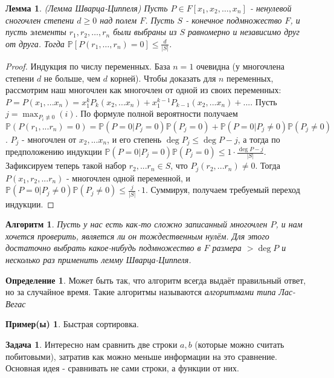 \documentclass[a4paper]{article}
\theoremstyle{indented}
\newtheorem{lemma}{Лемма}
\newtheorem{alg}{Алгоритм}
\theoremstyle{definition}
\newtheorem{defn}{Определение}
\newtheorem{exl}{Пример(ы)}
\newtheorem{prob}{Задача}
\theoremstyle{remark}
\begin{document}
\begin{lemma}
(Лемма Шварца-Циппеля) Пусть $P \in F[x_1, x_2, \ldots, x_n]$ - ненулевой сногочлен степени $d \geq 0$ над полем $F$. Пусть $S$ - конечное подмножество $F$, и пусть элементы $r_1, r_2, \ldots, r_n$ были выбраны из $S$ равномерно и независимо друг от друга. Тогда $\mathbb{P}[P(r_1, \ldots, r_n) = 0] \leq \frac{d}{|S|}$.
\end{lemma} 
\begin{proof}
Индукция по числу переменных. База $n=1$ очевидна (у многочлена степени $d$ не больше, чем $d$ корней). Чтобы доказать для $n$ переменных, рассмотрим наш многочлен как многочлен от одной из своих переменных: $P=P(x_1, ... x_n)=x_1^kP_k(x_2, ... x_n)+x_1^{k-1}P_{k-1}(x_2, ... x_n)+...$. Пусть $j=\max_{P_{i} \not \equiv 0}(i)$. По формуле полной вероятности получаем $\mathbb{P}(P(r_1, ... r_n)=0)=\mathbb{P}(P=0 | P_j=0)\mathbb{P}(P_j=0)+\mathbb{P}(P=0 | P_j \neq 0)\mathbb{P}(P_j \neq 0)$. $P_j$ - многочлен от $x_2, ... x_n$, и его степень $\deg P_j \leq \deg P - j$, а тогда по предположению индукции $\mathbb{P}(P=0 | P_j=0)\mathbb{P}(P_j=0) \leq 1 \cdot \frac{\deg P - j}{|S|}$. Зафиксируем теперь такой набор $r_2, ... r_n \in S$, что $P_j(r_2, ... r_n) \neq 0$. Тогда $P(x_1, r_2, ... r_n)$ - многочлен одной переменной, и $\mathbb{P}(P=0 | P_j \neq 0)\mathbb{P}(P_j \neq 0) \leq \frac{j}{|S|} \cdot 1$. Суммируя, получаем требуемый переход индукции. 
\end{proof}

\begin{alg} 
Пусть у нас есть как-то сложно записанный многочлен $P$, и нам хочется проверить, является ли он тождественным нулём. Для этого достаточно выбрать какое-нибудь подмножество в $F$ размера $> \deg P$ и несколько раз применить лемму Шварца-Циппеля.
\end{alg}

\begin{defn}
Может быть так, что алгоритм всегда выдаёт правильный ответ, но за случайное время. Такие алгоритмы называются \textit{алгоритмами типа Лас-Вегас}
\end{defn}
\begin{exl}
Быстрая сортировка.
\end{exl}

\begin{prob}
Интересно нам сравнить две строки $a, b$ (которые можно считать побитовыми), затратив как можно меньше информации на это сравнение. Основная идея - сравнивать не сами строки, а функции от них. 
\end{prob}
\end{document}
